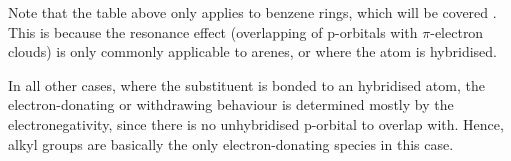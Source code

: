 				Note that the table above only applies to benzene rings, which will be covered \hyperlink{ChapterArenes}{}. This is because
				the resonance effect (overlapping of p-orbitals with $\pi$-electron clouds) is only commonly applicable to arenes, or where
				the atom is \sptwo{} hybridised.

				In all other cases, where the substituent is bonded to an \spthree{} hybridised atom, the electron-donating or withdrawing
				behaviour is determined mostly by the electronegativity, since there is no unhybridised p-orbital to overlap with. Hence,
				alkyl groups are basically the only electron-donating species in this case.


















